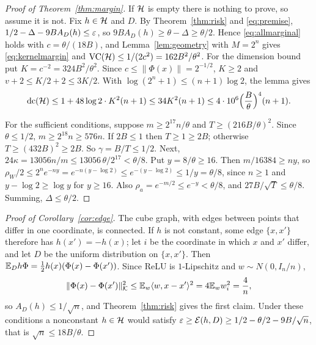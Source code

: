 \documentclass[11pt,letterpaper,pmlr,twoside]{jmlr}
\newcommand{\Kc}{\mathcal K}\newcommand{\sgn}{\operatorname{sign}}
\newcommand{\ip}[2]{\langle #1,#2\rangle}\newcommand{\norm}[1]{\lVert #1\rVert}
\begin{document}
\begin{proof}[Proof of Theorem~\ref{thm:margin}]
If $\mathcal H$ is empty there is nothing to prove, so assume it is not. Fix $h\in\mathcal H$ and $D$. By Theorem~\ref{thm:risk} and \eqref{eq:premise}, $1/2-\Delta-9BA_D(h)\le\varepsilon$, so $9BA_D(h)\ge\theta-\Delta\ge\theta/2$. Hence \eqref{eq:allmarginal} holds with $c=\theta/(18B)$, and Lemma~\ref{lem:geometry} with $M=2^n$ gives \eqref{eq:kernelmargin} and $\operatorname{VC}(\mathcal H)\le1/(2c^2)=162B^2/\theta^2$. For the dimension bound put $K=c^{-2}=324B^2/\theta^2$. Since $c\le\norm{\Phi(x)}=2^{-1/2}$, $K\ge2$ and $v+2\le K/2+2\le3K/2$. With $\log(2^n+1)\le(n+1)\log2$, the lemma gives
\[
 \operatorname{dc}(\mathcal H)\le1+48\log2\cdot K^2(n+1)\le34K^2(n+1)\le4\cdot10^6\Bigl(\frac B\theta\Bigr)^4(n+1).
\]

For the sufficient conditions, suppose $m\ge2^{17}n/\theta$ and $T\ge(216B/\theta)^2$. Since $\theta\le1/2$, $m\ge2^{18}n\ge576n$. If $2B\le1$ then $T\ge1\ge2B$; otherwise $T\ge(432B)^2\ge2B$. So $\gamma=B/T\le1/2$. Next, $24\kappa=13056n/m\le13056\,\theta/2^{17}<\theta/8$. Put $y=8/\theta\ge16$. Then $m/16384\ge ny$, so $\rho_W/2\le2^ne^{-ny}=e^{-n(y-\log2)}\le e^{-(y-\log2)}\le1/y=\theta/8$, since $n\ge1$ and $y-\log2\ge\log y$ for $y\ge16$. Also $\rho_a=e^{-m/2}\le e^{-y}<\theta/8$, and $27B/\sqrt T\le\theta/8$. Summing, $\Delta\le\theta/2$.
\end{proof}

\begin{proof}[Proof of Corollary~\ref{cor:edge}]
The cube graph, with edges between points that differ in one coordinate, is connected. If $h$ is not constant, some edge $\{x,x'\}$ therefore has $h(x')=-h(x)$; let $i$ be the coordinate in which $x$ and $x'$ differ, and let $D$ be the uniform distribution on $\{x,x'\}$. Then $\mathbb E_Dh\Phi=\tfrac12h(x)(\Phi(x)-\Phi(x'))$. Since ReLU is $1$-Lipschitz and $w\sim N(0,I_n/n)$,
\[
 \norm{\Phi(x)-\Phi(x')}_{\Kc}^2\le\E_w\ip w{x-x'}^2=4\E_ww_i^2=\frac4n,
\]
so $A_D(h)\le1/\sqrt n$, and Theorem~\ref{thm:risk} gives the first claim. Under these conditions a nonconstant $h\in\mathcal H$ would satisfy $\varepsilon\ge\mathcal E(h,D)\ge1/2-\theta/2-9B/\sqrt n$, that is $\sqrt n\le18B/\theta$.
\end{proof}
\end{document}
